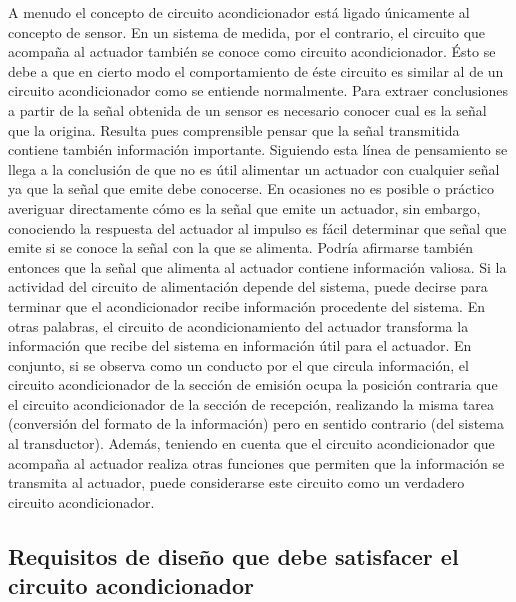 A menudo el concepto de circuito acondicionador está ligado únicamente al
concepto de sensor. En un sistema de medida, por el contrario, el circuito
que acompaña al actuador también se conoce como circuito acondicionador.
Ésto se debe a que en cierto modo el comportamiento de éste circuito es
similar al de un circuito acondicionador como se entiende normalmente. Para
extraer conclusiones a partir de la señal obtenida de un sensor es
necesario conocer cual es la señal que la origina. Resulta pues
comprensible pensar que la señal transmitida contiene también información
importante. Siguiendo esta línea de pensamiento se llega a la conclusión de
que no es útil alimentar un actuador con cualquier señal ya que la señal
que emite debe conocerse. En ocasiones no es posible o práctico averiguar
directamente cómo es la señal que emite un actuador, sin embargo,
conociendo la respuesta del actuador al impulso es fácil determinar que
señal que emite si se conoce la señal con la que se alimenta. Podría
afirmarse también entonces que la señal que alimenta al actuador contiene
información valiosa. Si la actividad del circuito de alimentación depende
del sistema, puede decirse para terminar que el acondicionador recibe
información procedente del sistema. En otras palabras, el circuito de
acondicionamiento del actuador transforma la información que recibe del
sistema en información útil para el actuador. En conjunto, si se observa
como un conducto por el que circula información, el circuito acondicionador
de la sección de emisión ocupa la posición contraria que el circuito
acondicionador de la sección de recepción, realizando la misma tarea
(conversión del formato de la información) pero en sentido contrario
(del sistema al transductor). Además, teniendo en cuenta que el circuito
acondicionador que acompaña al actuador realiza otras funciones que
permiten que la información se transmita al actuador, puede considerarse
este circuito como un verdadero circuito acondicionador.


\subsection[Requisitos de diseño del circuito acondicionador]{Requisitos de
diseño que debe satisfacer el circuito acondicionador}

